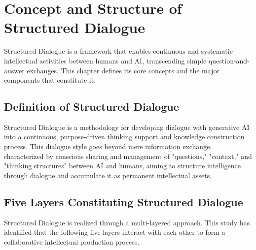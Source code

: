 \documentclass[11pt]{article}
\begin{document}
\section{Concept and Structure of Structured Dialogue}
Structured Dialogue is a framework that enables continuous and systematic intellectual activities between humans and AI, transcending simple question-and-answer exchanges. This chapter defines its core concepts and the major components that constitute it.
\subsection{Definition of Structured Dialogue}
Structured Dialogue is a methodology for developing dialogue with generative AI into a continuous, purpose-driven thinking support and knowledge construction process. This dialogue style goes beyond mere information exchange, characterized by conscious sharing and management of "questions," "context," and "thinking structures" between AI and humans, aiming to structure intelligence through dialogue and accumulate it as permanent intellectual assets.
\subsection{Five Layers Constituting Structured Dialogue}
Structured Dialogue is realized through a multi-layered approach. This study has identified that the following five layers interact with each other to form a collaborative intellectual production process.
\end{document}
